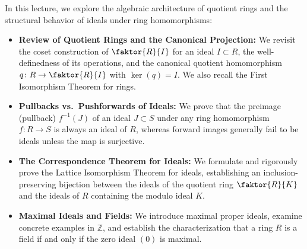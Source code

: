 


\begin{overview}
In this lecture, we explore the algebraic architecture of quotient rings and the structural behavior of ideals under ring homomorphisms:
\begin{itemize}
    \item \textbf{Review of Quotient Rings and the Canonical Projection:} We revisit the coset construction of $\faktor{R}{I}$ for an ideal $I \subset R$, the well-definedness of its operations, and the canonical quotient homomorphism $q \colon R \to \faktor{R}{I}$ with $\ker(q) = I$. We also recall the First Isomorphism Theorem for rings.
    \item \textbf{Pullbacks vs.\ Pushforwards of Ideals:} We prove that the preimage (pullback) $f^{-1}(J)$ of an ideal $J \subset S$ under any ring homomorphism $f \colon R \to S$ is always an ideal of $R$, whereas forward images generally fail to be ideals unless the map is surjective.
    \item \textbf{The Correspondence Theorem for Ideals:} We formulate and rigorously prove the Lattice Isomorphism Theorem for ideals, establishing an inclusion-preserving bijection between the ideals of the quotient ring $\faktor{R}{K}$ and the ideals of $R$ containing the modulo ideal $K$.
    \item \textbf{Maximal Ideals and Fields:} We introduce maximal proper ideals, examine concrete examples in $\mathbb{Z}$, and establish the characterization that a ring $R$ is a field if and only if the zero ideal $(0)$ is maximal.
\end{itemize}
\end{overview}

